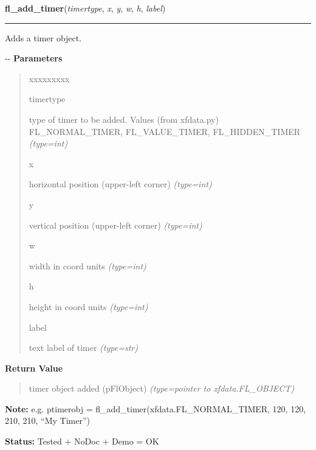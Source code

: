     \vspace{0.5ex}

\hspace{.8\funcindent}\begin{boxedminipage}{\funcwidth}

    \raggedright \textbf{fl\_add\_timer}(\textit{timertype}, \textit{x}, \textit{y}, \textit{w}, \textit{h}, \textit{label})

    \vspace{-1.5ex}

    \rule{\textwidth}{0.5\fboxrule}
\setlength{\parskip}{2ex}

Adds a timer object.

-{}-
\setlength{\parskip}{1ex}
      \textbf{Parameters}
      \vspace{-1ex}

      \begin{quote}
        \begin{Ventry}{xxxxxxxxx}

          \item[timertype]


type of timer to be added. Values (from xfdata.py) FL\_NORMAL\_TIMER,
FL\_VALUE\_TIMER, FL\_HIDDEN\_TIMER
            {\it (type=int)}

          \item[x]


horizontal position (upper-left corner)
            {\it (type=int)}

          \item[y]


vertical position (upper-left corner)
            {\it (type=int)}

          \item[w]


width in coord units
            {\it (type=int)}

          \item[h]


height in coord units
            {\it (type=int)}

          \item[label]


text label of timer
            {\it (type=str)}

        \end{Ventry}

      \end{quote}

      \textbf{Return Value}
    \vspace{-1ex}

      \begin{quote}

timer object added (pFlObject)
      {\it (type=pointer to xfdata.FL\_OBJECT)}

      \end{quote}

\textbf{Note:} 
e.g. ptimerobj = fl\_add\_timer(xfdata.FL\_NORMAL\_TIMER, 120, 120,
210, 210, ``My Timer'')


\textbf{Status:} 
Tested + NoDoc + Demo = OK


    \end{boxedminipage}

